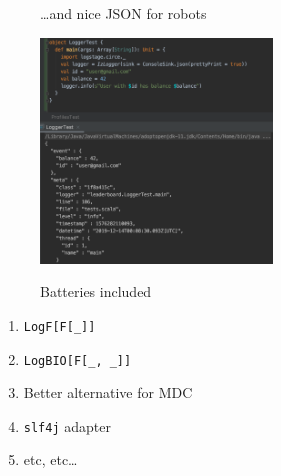 \documentclass[usenames,dvipsnames,aspectratio=169]{beamer}
\begin{document}
\begin{frame}
  \begin{figure}
  \large \dots and nice JSON for robots
  \end{figure}

  \begin{figure}
    \includegraphics[width=0.55\textwidth]{media/json.png}
  \end{figure}
\end{frame}

\begin{frame}
  \begin{figure}
  \Huge Batteries included
  \end{figure}

  \begin{enumerate}
  \item \texttt{LogF[F[\_]]}
  \item \texttt{LogBIO[F[\_, \_]]}
  \item Better alternative for MDC
  \item \texttt{slf4j} adapter
  \item etc, etc\dots
  \end{enumerate}
\end{frame}
\end{document}
